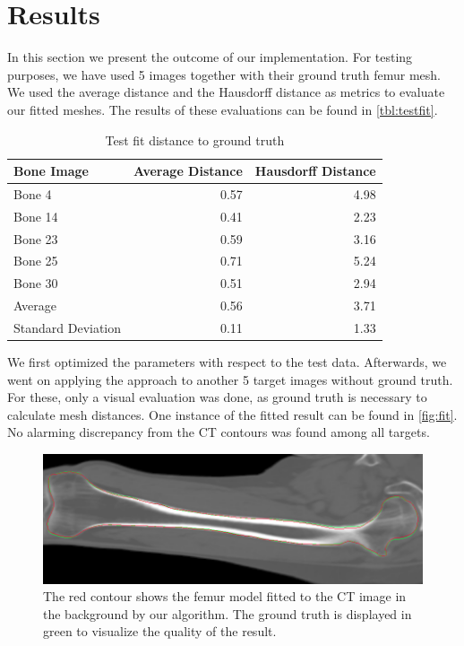 \section{Results}
\label{sec:results}

In this section we present the outcome of our implementation.
For testing purposes, we have used 5 images together with their ground truth femur mesh.
We used the average distance and the Hausdorff distance as metrics to evaluate our fitted meshes.
The results of these evaluations can be found in \autoref{tbl:testfit}.

\begin{table}
  \centering
  \caption{Test fit distance to ground truth}
  \label{tbl:testfit}
  \begin{tabular}{lrr}
    \toprule
      \textbf{Bone Image} &
      Average Distance &
       Hausdorff Distance \\
    \midrule
      Bone 4 & 0.57 & 4.98 \\
      Bone 14 & 0.41 & 2.23 \\
      Bone 23 & 0.59 & 3.16 \\
      Bone 25 & 0.71 & 5.24 \\
      Bone 30 & 0.51 & 2.94 \\
    \midrule
      Average & 0.56 & 3.71 \\
      Standard Deviation & 0.11 & 1.33 \\
    \bottomrule
  \end{tabular}
\end{table}

We first optimized the parameters with respect to the test data.
Afterwards, we went on applying the approach to another 5 target images without ground truth.
For these, only a visual evaluation was done, as ground truth is necessary to calculate mesh distances.
One instance of the fitted result can be found in \autoref{fig:fit}.
No alarming discrepancy from the CT contours was found among all targets.

\begin{figure}
  \centering
  \includegraphics[width=\textwidth]{./Figures/mcmc_fit}
  \caption{
    The red contour shows the femur model fitted to the CT image in the background by our algorithm. 
    The ground truth is displayed in green to visualize the quality of the result.
  }
  \label{fig:fit}
\end{figure}
